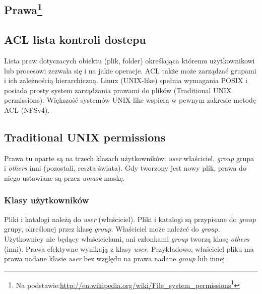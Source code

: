 \documentclass[a4paper,titlepage,12pt]{mwart}
\begin{document}
\begin{enumerate}
\section{Prawa\footnote{Na podstawie:\url{http://en.wikipedia.org/wiki/File\_system\_permissions}\footnote{Patrz też:\url{http://www.ibm.com/developerworks/library/l-lpic1-v3-104-5/}}}}
\subsection{ACL lista kontroli dostepu}
Lista praw dotyczacych obiektu (plik, folder) określająca któremu użytkownikowi lub procesowi zezwala się i na jakie operacje. ACL także może zarządzać grupami i ich zależnością hierarchiczną. Linux (UNIX-like) spełnia wymagania POSIX i posiada prosty system zarządzania prawami do plików (Traditional UNIX permissions). Większość systemów UNIX-like wspiera w pewnym zakresie metodę ACL (NFSv4).
\subsection{Traditional UNIX permissions}
Prawa tu oparte są na trzech klasach użytkowników: \textit{user} właściciel, \textit{group} grupa i \textit{others} inni (pozostali, reszta świata). Gdy tworzony jest nowy plik, prawa do niego ustawiane są przez \textit{umask} maskę. 
\subsubsection{Klasy użytkowników}
Pliki i katalogi należą do \textit{user} (właściciel). Pliki i katalogi są przypisane do \textit{group} grupy, określonej przez klasę \textit{group}. Właściciel może należeć do \textit{group}. Użytkownicy nie będący właścicielami, ani członkami \textit{group} tworzą klasę \textit{others} (inni).\newline
Prawa efektywne wynikają z klasy \textit{user}. Przykładowo, właściciel pliku ma prawa nadane klasie \textit{user} bez względu na prawa nadane \textit{group} lub innej.

\end{enumerate}
\end{document}
